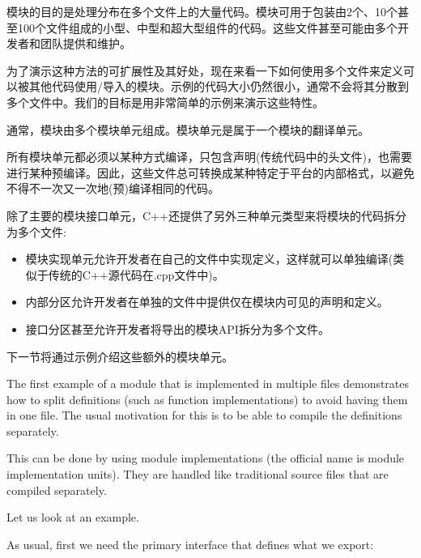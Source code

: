 

模块的目的是处理分布在多个文件上的大量代码。模块可用于包装由2个、10个甚至100个文件组成的小型、中型和超大型组件的代码。这些文件甚至可能由多个开发者和团队提供和维护。

为了演示这种方法的可扩展性及其好处，现在来看一下如何使用多个文件来定义可以被其他代码使用/导入的模块。示例的代码大小仍然很小，通常不会将其分散到多个文件中。我们的目标是用非常简单的示例来演示这些特性。


通常，模块由多个模块单元组成。模块单元是属于一个模块的翻译单元。

所有模块单元都必须以某种方式编译，只包含声明(传统代码中的头文件)，也需要进行某种预编译。因此，这些文件总可转换成某种特定于平台的内部格式，以避免不得不一次又一次地(预)编译相同的代码。

除了主要的模块接口单元，C++还提供了另外三种单元类型来将模块的代码拆分为多个文件:

\begin{itemize}
\item 
模块实现单元允许开发者在自己的文件中实现定义，这样就可以单独编译(类似于传统的C++源代码在.cpp文件中)。

\item 
内部分区允许开发者在单独的文件中提供仅在模块内可见的声明和定义。

\item 
接口分区甚至允许开发者将导出的模块API拆分为多个文件。
\end{itemize}

下一节将通过示例介绍这些额外的模块单元。


The first example of a module that is implemented in multiple files demonstrates how to split definitions (such as function implementations) to avoid having them in one file. The usual motivation for this is to be able to compile the definitions separately.

This can be done by using module implementations (the official name is module implementation units). They are handled like traditional source files that are compiled separately.

Let us look at an example.


As usual, first we need the primary interface that defines what we export:



